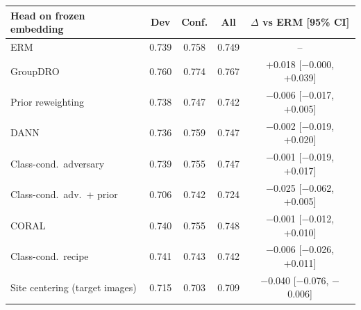\begin{tabular}{lcccc}
\toprule
Head on frozen embedding & Dev & Conf. & All & $\Delta$ vs ERM [95\% CI] \\
\midrule
ERM & 0.739 & 0.758 & 0.749 & -- \\
GroupDRO & 0.760 & 0.774 & 0.767 & +0.018 [\ensuremath{-}0.000, +0.039] \\
Prior reweighting & 0.738 & 0.747 & 0.742 & \ensuremath{-}0.006 [\ensuremath{-}0.017, +0.005] \\
DANN & 0.736 & 0.759 & 0.747 & \ensuremath{-}0.002 [\ensuremath{-}0.019, +0.020] \\
Class-cond.\ adversary & 0.739 & 0.755 & 0.747 & \ensuremath{-}0.001 [\ensuremath{-}0.019, +0.017] \\
Class-cond.\ adv.\ + prior & 0.706 & 0.742 & 0.724 & \ensuremath{-}0.025 [\ensuremath{-}0.062, +0.005] \\
CORAL & 0.740 & 0.755 & 0.748 & \ensuremath{-}0.001 [\ensuremath{-}0.012, +0.010] \\
Class-cond.\ recipe & 0.741 & 0.743 & 0.742 & \ensuremath{-}0.006 [\ensuremath{-}0.026, +0.011] \\
Site centering (target images) & 0.715 & 0.703 & 0.709 & \ensuremath{-}0.040 [\ensuremath{-}0.076, \ensuremath{-}0.006] \\
\bottomrule
\end{tabular}